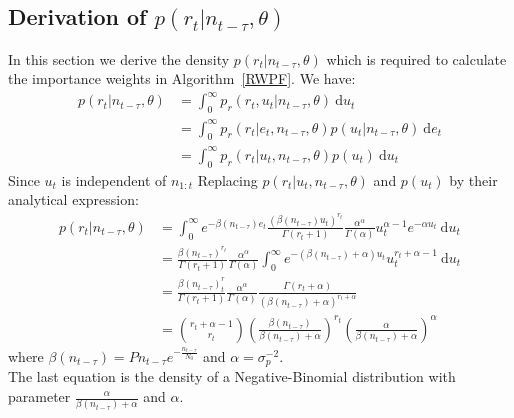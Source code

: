 \documentclass[12pt]{article}
\begin{document}
\begin{appendices}
	\subsection{Derivation of $p(r_t|n_{t-\tau}, \theta)$} \label{rDensity}
	In this section we derive the density $p(r_t|n_{t-\tau}, \theta)$ which is required to calculate the importance weights in Algorithm~\ref{RWPF}.
	We have:
	\begin{align*}
	p(r_t | n_{t-\tau}, \theta) & = \int_{0}^{\infty}p_r(r_t, u_t | n_{t-\tau}, \theta)\ \mathrm{d}u_t \\
	& = \int_{0}^{\infty}p_r(r_t | e_t, n_{t-\tau}, \theta)p(u_t | n_{t-\tau}, \theta)\ \mathrm{d}e_t \\
	& = \int_{0}^{\infty}p_r(r_t | u_t, n_{t-\tau}, \theta)p(u_t)\ \mathrm{d}u_t
	\end{align*}
	Since $u_t$ is independent of $n_{1:t}$
	Replacing $p(r_t | u_t, n_{t-\tau}, \theta)$ and $p(u_t)$ by their analytical expression:
	\begin{align*}
	p(r_t | n_{t-\tau}, \theta) & = \int_{0}^{\infty}e^{-\beta(n_{t-\tau})e_t}\frac{(\beta(n_{t-\tau})u_t)^{r_t}}{\Gamma(r_t+1)}\frac{\alpha^\alpha}{\Gamma(\alpha)}u_t^{\alpha-1}e^{-\alpha u_t}\ \mathrm{d}u_t \\
	& = \frac{\beta(n_{t-\tau})^{r_t}}{\Gamma(r_t+1)}\frac{\alpha^\alpha}{\Gamma(\alpha)}\int_{0}^{\infty}e^{-(\beta(n_{t-\tau})+\alpha)u_t}u_t^{r_t+\alpha-1}\ \mathrm{d}u_t \\
	& = \frac{\beta(n_{t-\tau})^r_t}{\Gamma(r_t+1)}\frac{\alpha^\alpha}{\Gamma(\alpha)}\frac{\Gamma(r_t+\alpha)}{(\beta(n_{t-\tau})+\alpha)^{r_t+\alpha}} \\
	& = \binom{r_t + \alpha - 1}{r_t}(\frac{\beta(n_{t-\tau})}{\beta(n_{t-\tau}) + \alpha})^{r_t}(\frac{\alpha}{\beta(n_{t-\tau}) + \alpha})^\alpha
	\end{align*}
	where $\beta(n_{t-\tau}) = Pn_{t-\tau}e^{-\frac{n_{t-\tau}}{N_0}}$ and $\alpha = \sigma_p^{-2}$. \\
	The last equation is the density of a Negative-Binomial distribution with parameter $\frac{\alpha}{\beta(n_{t-\tau}) + \alpha}$ and $\alpha$.
	

\end{appendices}
\end{document}
